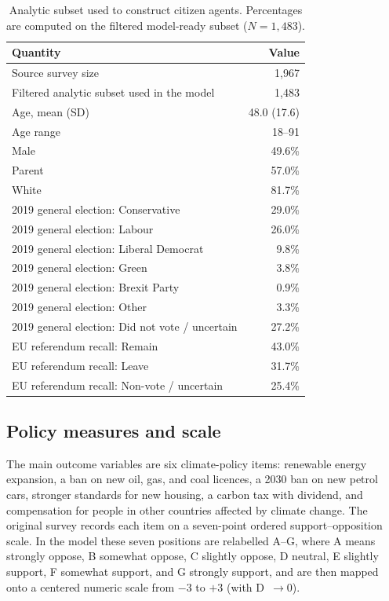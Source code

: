 \documentclass[pdflatex,sn-mathphys-num]{sn-jnl}%
\theoremstyle{thmstyleone}%
\theoremstyle{thmstyletwo}%
\theoremstyle{thmstylethree}%
\begin{document}
\begin{table}[t]
	\centering
	\footnotesize
	\caption{Analytic subset used to construct citizen agents. Percentages are computed on the filtered model-ready subset ($N=1{,}483$).}
	\label{tab:si-survey-sample}
	\begin{tabular}{p{}r}
		\toprule
		Quantity & Value \\
		\midrule
		Source survey size & 1,967 \\
		Filtered analytic subset used in the model & 1,483 \\
		Age, mean (SD) & 48.0 (17.6) \\
		Age range & 18--91 \\
		Male & 49.6\% \\
		Parent & 57.0\% \\
		White & 81.7\% \\
		2019 general election: Conservative & 29.0\% \\
		2019 general election: Labour & 26.0\% \\
		2019 general election: Liberal Democrat & 9.8\% \\
		2019 general election: Green & 3.8\% \\
		2019 general election: Brexit Party & 0.9\% \\
		2019 general election: Other & 3.3\% \\
		2019 general election: Did not vote / uncertain & 27.2\% \\
		EU referendum recall: Remain & 43.0\% \\
		EU referendum recall: Leave & 31.7\% \\
		EU referendum recall: Non-vote / uncertain & 25.4\% \\
		\bottomrule
	\end{tabular}
\end{table}

\subsection{Policy measures and scale}\label{subsec:si-policy-measures}

The main outcome variables are six climate-policy items: renewable energy
expansion, a ban on new oil, gas, and coal licences, a 2030 ban on new petrol
cars, stronger standards for new housing, a carbon tax with dividend, and
compensation for people in other countries affected by climate change. The
original survey records each item on a seven-point ordered support--opposition
scale. In the model these seven positions are relabelled A--G, where A means
strongly oppose, B somewhat oppose, C slightly oppose, D neutral, E slightly
support, F somewhat support, and G strongly support, and are then mapped onto a
centered numeric scale from $-3$ to $+3$ (with D~$\to 0$).
\end{document}
